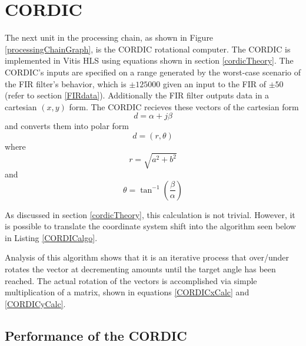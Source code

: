 \documentclass[../report_polarFIR.tex]{subfiles}
\begin{document}
\chapter{CORDIC}

The next unit in the processing chain, as shown in Figure \ref{processingChainGraph}, is the CORDIC rotational computer. The CORDIC is implemented in Vitis HLS using equations shown in section \ref{cordicTheory}. The CORDIC's inputs are specified on a range generated by the worst-case scenario of the FIR filter's behavior, which is $\pm 125000$ given an input to the FIR of $\pm 50$ (refer to section \ref{FIRdata}). Additionally the FIR filter outputs data in a cartesian $(x, y)$ form. The CORDIC recieves these vectors of the cartesian form 
\begin{equation}
	d = \alpha + j\beta
\end{equation}
and converts them into polar form
\begin{equation}
	d = (r, \theta)
\end{equation}
where
\begin{equation}
	r = \sqrt{a^2 + b^2}
\end{equation}
and
\begin{equation}
	\theta = \tan^{-1}\left({\frac{\beta}{\alpha}}\right)
\end{equation}

As discussed in section \ref{cordicTheory}, this calculation is not trivial. However, it is possible to translate the coordinate system shift into the algorithm seen below in Listing \ref{CORDICalgo}.

		\begin{singlespace}
            
        \end{singlespace}

Analysis of this algorithm shows that it is an iterative process that over/under rotates the vector at decrementing amounts until the target angle has been reached. The actual rotation of the vectors is accomplished via simple multiplication of a matrix, shown in equations \ref{CORDICxCalc} and \ref{CORDICyCalc}. 



\section{Performance of the CORDIC}
\end{document}
